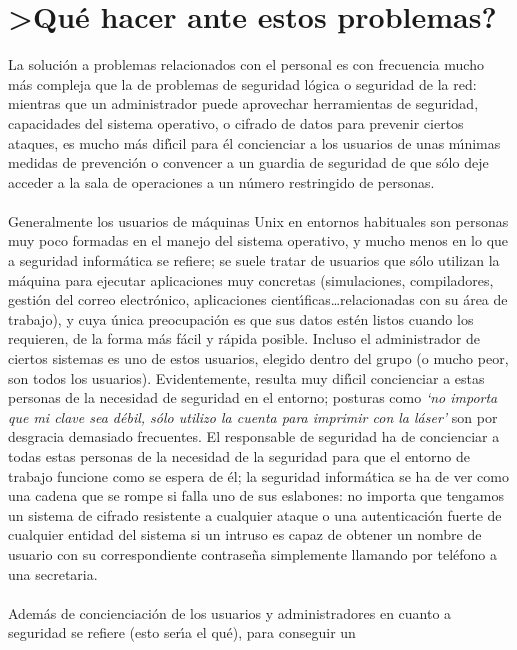 \section{>Qu\'e hacer ante estos problemas?}
La soluci\'on a problemas relacionados con el personal es con frecuencia mucho
m\'as compleja que la de problemas de seguridad l\'ogica o seguridad de la
red: mientras que un administrador puede aprovechar herramientas de seguridad, 
capacidades del sistema operativo, o cifrado de datos para prevenir ciertos 
ataques, es mucho m\'as dif\'{\i}cil para \'el concienciar a los usuarios de 
unas m\'{\i}nimas medidas de prevenci\'on o convencer a un guardia de seguridad
de que s\'olo deje acceder a la sala de operaciones a un n\'umero restringido de
personas.\\
\\Generalmente los usuarios de m\'aquinas Unix en entornos habituales son 
personas
muy poco formadas en el manejo del sistema operativo, y mucho menos en lo que
a seguridad inform\'atica se refiere; se suele tratar de usuarios que 
s\'olo utilizan la m\'aquina para ejecutar aplicaciones muy concretas 
(simulaciones, compiladores, gesti\'on del correo electr\'onico, aplicaciones 
cient\'{\i}ficas\ldots relacionadas con su \'area de trabajo), y cuya \'unica 
preocupaci\'on es que sus datos est\'en listos cuando
los requieren, de la forma m\'as f\'acil y r\'apida posible. Incluso el 
administrador de ciertos sistemas es uno de estos usuarios, elegido dentro del
grupo (o mucho peor, son todos los usuarios). Evidentemente, resulta muy 
dif\'{\i}cil concienciar a estas personas de la necesidad de seguridad en el
entorno; posturas como {\it `no importa que mi clave sea d\'ebil, s\'olo
utilizo la cuenta para imprimir con la l\'aser'} son por desgracia demasiado
frecuentes. El responsable de seguridad ha de concienciar a todas estas personas
de la necesidad de la seguridad para que el entorno de trabajo funcione como
se espera de \'el; la seguridad inform\'atica se ha de ver como una cadena que
se rompe si falla uno de sus eslabones: no importa que tengamos un sistema 
de cifrado resistente a cualquier ataque o una autenticaci\'on fuerte de 
cualquier entidad del sistema si un intruso es capaz de obtener un nombre de 
usuario con su correspondiente contrase\~na simplemente llamando por tel\'efono
a una secretaria.\\
\\Adem\'as de concienciaci\'on de los usuarios y administradores en cuanto
a seguridad se refiere (esto ser\'{\i}a el {\sc qu\'e}), para conseguir un 
